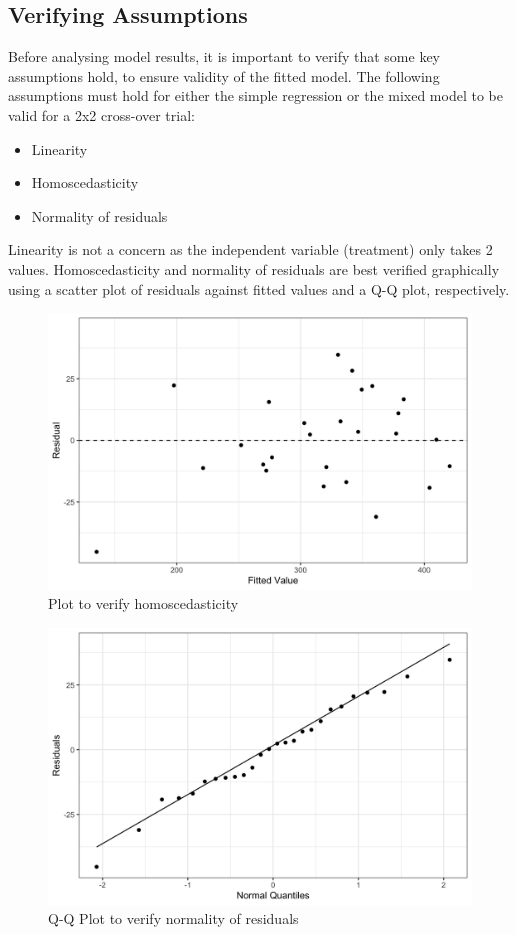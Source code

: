 \documentclass[12pt, TexShade, letterpaper]{report}
\begin{document}
\subsection{Verifying Assumptions}
Before analysing model results, it is important to verify that some key assumptions hold, to ensure validity of the fitted model. The following assumptions must hold for either the simple regression or the mixed model to be valid for a 2x2 cross-over trial:
\begin{itemize}
    \item Linearity
    \item Homoscedasticity
    \item Normality of residuals
\end{itemize}
Linearity is not a concern as the independent variable (treatment) only takes 2 values. Homoscedasticity and normality of residuals are best verified graphically using a scatter plot of residuals against fitted values and a Q-Q plot, respectively.
\begin{figure}[ht]
    \centering
    \includegraphics[width=0.85\linewidth]{report/figures/homoscedasticityPlot.png}
    \caption{Plot to verify homoscedasticity}
    \label{fig:homoscedasticity}
\end{figure}
\begin{figure}[ht]
    \centering
    \includegraphics[width=0.85\linewidth]{report/figures/qqplot.png}
    \caption{Q-Q Plot to verify normality of residuals}
    \label{fig:qqplot}
\end{figure}
\end{document}
